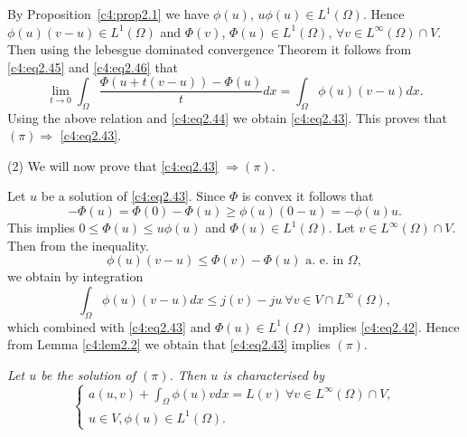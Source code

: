 By Proposition~\ref{c4:prop2.1} we have $\phi (u)$, $u \phi (u) \in
L^1 (\Omega)$. Hence $\phi (u) (v-u) \in L^1 (\Omega)$ and $\Phi (v)$,
$\Phi (u) \in L^1 (\Omega)$, $\forall v \in L^\infty (\Omega) \cap
V$. Then using the lebesgue dominated convergence Theorem it follows
from \eqref{c4:eq2.45} and \eqref{c4:eq2.46} that 
 $$
 \lim_{t \to 0} \int_\Omega \frac{\Phi (u+t (v-u)) -\Phi (u)} {t} dx = \int_\Omega \phi (u) (v-u) dx.
 $$\pageoriginale 
 Using the above relation and \eqref{c4:eq2.44} we obtain \eqref{c4:eq2.43}. This proves that $(\pi) \Rightarrow$ \eqref{c4:eq2.43}.
 
(2) We will now prove that \eqref{c4:eq2.43} $\Rightarrow (\pi)$.
 
Let $u$ be a solution of \eqref{c4:eq2.43}. Since $\Phi$ is convex it follows that
 $$
- \Phi (u) = \Phi (0) - \Phi (u) \geq \phi (u) (0-u) = -\phi (u) u.
 $$
 This implies $0 \leq \Phi (u) \leq u \phi (u)$ and $\Phi (u) \in L^1 (\Omega)$. Let $v \in L^\infty (\Omega) \cap V$. Then from the inequality.
 $$
\phi (u) (v-u) \leq \Phi (v) -\Phi (u) \text{ a. e. in } \Omega,
 $$
 we obtain by integration
 $$
 \int_\Omega  \phi (u) (v-u) dx \leq j (v) -j u \ \forall v \in V \cap L^\infty (\Omega), 
 $$
 which combined with \eqref{c4:eq2.43} and $\Phi (u) \in L^1 (\Omega)$ implies \eqref{c4:eq2.42}. Hence from Lemma \ref{c4:lem2.2} we obtain that \eqref{c4:eq2.43} implies $(\pi)$.

 \begin{lemma}\label{c4:lem2.4}%
{\em Let $u$ be the solution of $(\pi)$. Then $u$ is characterised by }
\begin{equation}
\begin{cases}
a (u, v) + \int_\Omega \phi (u) v dx = L (v) \ \forall v \in L^\infty (\Omega) \cap V,\\
u \in V, \phi (u) \in L^1 (\Omega). \tag{2.47}\label{c4:eq2.47}
\end{cases}
\end{equation}
 \end{lemma}

